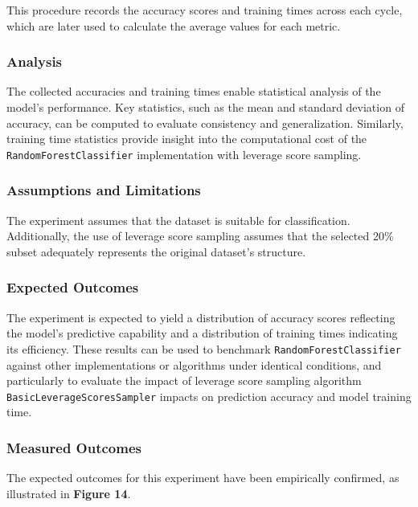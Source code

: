 \documentclass{article}
\theoremstyle{plain}
\theoremstyle{definition}
\theoremstyle{remark}
\begin{document}
This procedure records the accuracy scores and training times across each cycle, which are later used to calculate the average values for each metric.

\subsubsection{Analysis}

The collected accuracies and training times enable statistical analysis of the model's performance. Key statistics, such as the mean and standard deviation of accuracy, can be computed to evaluate consistency and generalization. Similarly, training time statistics provide insight into the computational cost of the \texttt{RandomForestClassifier} implementation with leverage score sampling.

\subsubsection{Assumptions and Limitations}

The experiment assumes that the dataset is suitable for classification. Additionally, the use of leverage score sampling assumes that the selected 20\% subset adequately represents the original dataset's structure.

\subsubsection{Expected Outcomes}

The experiment is expected to yield a distribution of accuracy scores reflecting the model's predictive capability and a distribution of training times indicating its efficiency. These results can be used to benchmark \texttt{RandomForestClassifier} against other implementations or algorithms under identical conditions, and particularly to evaluate the impact of leverage score sampling algorithm \texttt{BasicLeverageScoresSampler} impacts on prediction accuracy and model training time.

\subsubsection{Measured Outcomes}

The expected outcomes for this experiment have been empirically confirmed, as illustrated in \textbf{Figure 14}.
\end{document}
